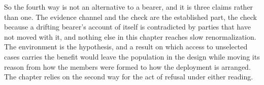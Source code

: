 So the fourth way is not an alternative to a bearer, and it is three claims rather than one. The evidence channel and the check are the established part, the check because a drifting bearer's account of itself is contradicted by parties that have not moved with it, and nothing else in this chapter reaches slow renormalization. The environment is the hypothesis, and a result on which access to unselected cases carries the benefit would leave the population in the design while moving its reason from how the members were formed to how the deployment is arranged. The chapter relies on the second way for the act of refusal under either reading.
